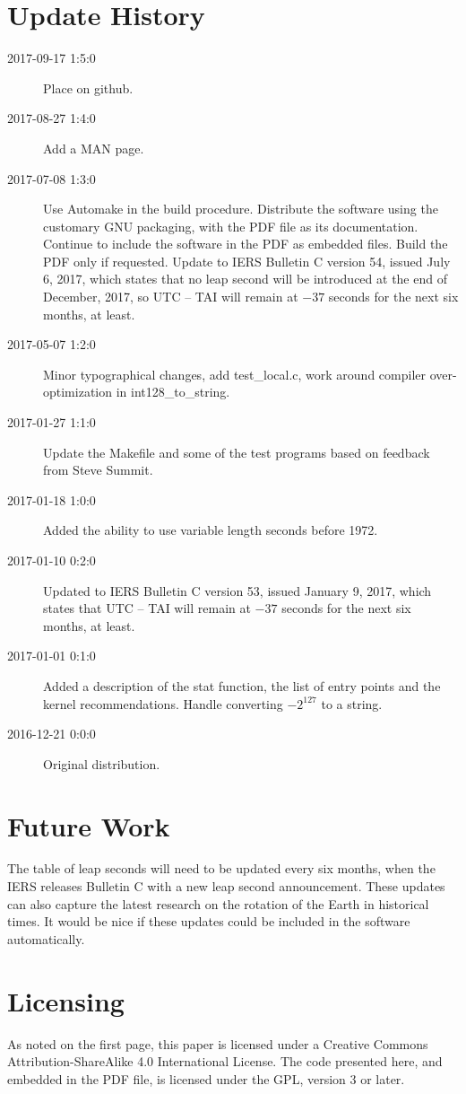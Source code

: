 \documentclass[letterpaper,twoside]{article}
\begin{document}
\section{Update History}
\begin{description}
\item[2017-09-17 1:5:0] Place on github.
\item[2017-08-27 1:4:0] Add a MAN page.
\item[2017-07-08 1:3:0] Use Automake in the build procedure.
  Distribute the software using the customary GNU packaging,
  with the PDF file as its documentation.  Continue to include
  the software in the PDF as embedded files.  Build the PDF
  only if requested.  Update to IERS Bulletin C version 54, issued
  July 6, 2017, which states that no leap second will be introduced
  at the end of December, 2017, so UTC -- TAI will remain at
  $-37$ seconds for the next six months, at least.
\item[2017-05-07 1:2:0] Minor typographical changes, add test\_local.c,
  work around compiler over-optimization in int128\_to\_string.
\item[2017-01-27 1:1:0] Update the Makefile and some of the test programs
  based on feedback from Steve Summit.
\item[2017-01-18 1:0:0] Added the ability to use variable length seconds
  before 1972.
\item[2017-01-10 0:2:0] Updated to IERS Bulletin C version 53,
  issued January 9, 2017, which states that UTC -- TAI
  will remain at $-37$ seconds for the next six months, at least.
\item[2017-01-01 0:1:0] Added a description of the stat function,
  the list of entry points and the kernel recommendations.
  Handle converting $-2^{127}$ to a string. 
\item[2016-12-21 0:0:0] Original distribution.
\end{description}

\section{Future Work}
The table of leap seconds will need to be updated every six months,
when the IERS releases Bulletin C with a new leap second announcement.
These updates can also capture the latest research on the rotation
of the Earth in historical times.  It would be nice if these updates
could be included in the software automatically.

\section{Licensing}
\label{section:Licensing}
As noted on the first page, this paper is licensed under a Creative
Commons Attribution-ShareAlike 4.0 International License.  The code
presented here, and embedded in the PDF file, is licensed under
the GPL, version 3 or later.
\end{document}
